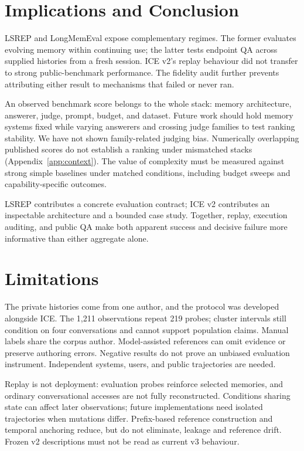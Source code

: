 \documentclass[11pt]{article}
\begin{document}
\section{Implications and Conclusion}
LSREP and LongMemEval expose complementary regimes. The former evaluates evolving memory within continuing use; the latter tests endpoint QA across supplied histories from a fresh session. ICE v2's replay behaviour did not transfer to strong public-benchmark performance. The fidelity audit further prevents attributing either result to mechanisms that failed or never ran.

An observed benchmark score belongs to the whole stack: memory architecture, answerer, judge, prompt, budget, and dataset. Future work should hold memory systems fixed while varying answerers and crossing judge families to test ranking stability. We have not shown family-related judging bias. Numerically overlapping published scores do not establish a ranking under mismatched stacks (Appendix~\ref{app:context}). The value of complexity must be measured against strong simple baselines under matched conditions, including budget sweeps and capability-specific outcomes.

LSREP contributes a concrete evaluation contract; ICE v2 contributes an inspectable architecture and a bounded case study. Together, replay, execution auditing, and public QA make both apparent success and decisive failure more informative than either aggregate alone.

\section*{Limitations}
The private histories come from one author, and the protocol was developed alongside ICE. The 1,211 observations repeat 219 probes; cluster intervals still condition on four conversations and cannot support population claims. Manual labels share the corpus author. Model-assisted references can omit evidence or preserve authoring errors. Negative results do not prove an unbiased evaluation instrument. Independent systems, users, and public trajectories are needed.

Replay is not deployment: evaluation probes reinforce selected memories, and ordinary conversational accesses are not fully reconstructed. Conditions sharing state can affect later observations; future implementations need isolated trajectories when mutations differ. Prefix-based reference construction and temporal anchoring reduce, but do not eliminate, leakage and reference drift. Frozen v2 descriptions must not be read as current v3 behaviour.
\end{document}

